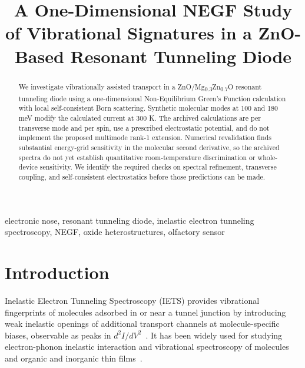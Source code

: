 \documentclass[conference]{IEEEtran}
\begin{document}
\title{A One-Dimensional NEGF Study of Vibrational Signatures in a ZnO-Based Resonant Tunneling Diode}

\author{
}

\IEEEaftertitletext{\vspace{-8pt}}
\maketitle

\begin{abstract}
We investigate vibrationally assisted transport in a ZnO/Mg\textsubscript{0.3}Zn\textsubscript{0.7}O resonant tunneling diode using a one-dimensional Non-Equilibrium Green's Function calculation with local self-consistent Born scattering. Synthetic molecular modes at 100 and 180 meV modify the calculated current at 300 K. The archived calculations are per transverse mode and per spin, use a prescribed electrostatic potential, and do not implement the proposed multimode rank-1 extension. Numerical revalidation finds substantial energy-grid sensitivity in the molecular second derivative, so the archived spectra do not yet establish quantitative room-temperature discrimination or whole-device sensitivity. We identify the required checks on spectral refinement, transverse coupling, and self-consistent electrostatics before those predictions can be made.

\end{abstract}

\begin{IEEEkeywords}
electronic nose, resonant tunneling diode, inelastic electron tunneling spectroscopy, NEGF, oxide heterostructures, olfactory sensor
\end{IEEEkeywords}

\section{Introduction}
Inelastic Electron Tunneling Spectroscopy (IETS) provides vibrational fingerprints of molecules adsorbed in or near a tunnel junction by introducing weak inelastic openings of additional transport channels at molecule-specific biases, observable as peaks in $d^2I/dV^2$~\cite{hansma1977,hansma1982,hipps1993,reed2008}. It has been widely used for studying electron-phonon inelastic interaction and vibrational spectroscopy of molecules and organic and inorganic thin films~\cite{jeong2015,liu2010,kim2011,wang2004,lauhon2001}. 
\end{document}
